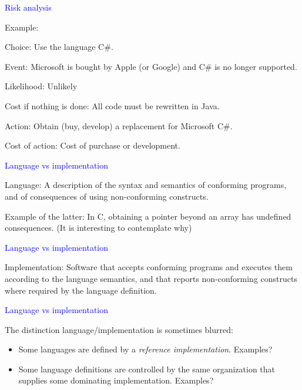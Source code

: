\documentclass{slides}
\newcommand{\ti}[1]{\begin{center}\Large{\textcolor{blue}{#1}}\end{center}}
\begin{document}
\begin{slide}\ti{Risk analysis}

Example:

Choice: Use the language C\#.

Event: Microsoft is bought by Apple (or Google) and C\# is no longer
supported.

Likelihood: Unlikely

Cost if nothing is done: All code must be rewritten in Java.

Action: Obtain (buy, develop) a replacement for Microsoft C\#.

Cost of action: Cost of purchase or development.

\vfill\end{slide}
\begin{slide}\ti{Language vs implementation}

Language: A description of the syntax and semantics of conforming
programs, and of consequences of using non-conforming constructs.

Example of the latter: In C, obtaining a pointer beyond an array has
undefined consequences.  (It is interesting to contemplate why)

\vfill\end{slide}
\begin{slide}\ti{Language vs implementation}

Implementation: Software that accepts conforming programs and executes
them according to the language semantics, and that reports
non-conforming constructs where required by the language definition.

\vfill\end{slide}
\begin{slide}\ti{Language vs implementation}

The distinction language/implementation is sometimes blurred:

\begin{itemize}
\item Some languages are defined by a \emph{reference
  implementation}.  Examples?
\item Some language definitions are controlled by the same
  organization that supplies some dominating implementation.
  Examples?
\end{itemize}

\vfill\end{slide}
\end{document}
